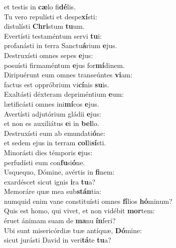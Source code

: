 \evenverse et testis in \textbf{cæ}lo fi\textbf{dé}lis.\\
\oddverse Tu vero repulísti et despe\textbf{xí}sti:~\*\\
\oddverse distulísti \textbf{Chri}stum \textbf{tu}um.\\
\evenverse Evertísti testaméntum servi \textbf{tu}i:~\*\\
\evenverse profanásti in terra Sanctu\textbf{á}rium \textbf{e}jus.\\
\oddverse Destruxísti omnes sepes \textbf{e}jus:~\*\\
\oddverse posuísti firmaméntum \textbf{e}jus for\textbf{mí}dinem.\\
\evenverse Diripuérunt eum omnes transeúntes \textbf{vi}am:~\*\\
\evenverse factus est oppróbrium vi\textbf{cí}nis \textbf{su}is.\\
\oddverse Exaltásti déxteram depriméntium \textbf{e}um:~\*\\
\oddverse lætificásti omnes ini\textbf{mí}cos \textbf{e}jus.\\
\evenverse Avertísti adjutórium gládii \textbf{e}jus:~\*\\
\evenverse et non es auxiliátus \textbf{e}i in \textbf{bel}lo.\\
\oddverse Destruxísti eum ab emundati\textbf{ó}ne:~\*\\
\oddverse et sedem ejus in terram \textbf{col}li\textbf{sí}sti.\\
\evenverse Minorásti dies témporis \textbf{e}jus:~\*\\
\evenverse perfudísti eum con\textbf{fu}si\textbf{ó}ne.\\
\oddverse Usquequo, Dómine, avértis in \textbf{fi}nem:~\*\\
\oddverse exardéscet sicut ignis \textbf{i}ra \textbf{tu}a?\\
\evenverse Memoráre quæ mea sub\textbf{stán}tia:~\*\\
\evenverse numquid enim vane constituísti omnes \textbf{fí}lios \textbf{hó}minum?\\
\oddverse Quis est homo, qui vivet, et non vidébit \textbf{mor}tem:~\*\\
\oddverse éruet ánimam suam de \textbf{ma}nu \textbf{ín}feri?\\
\evenverse Ubi sunt misericórdiæ tuæ antíquæ, \textbf{Dó}mine:~\*\\
\evenverse sicut jurásti David in veri\textbf{tá}te \textbf{tu}a?\\
